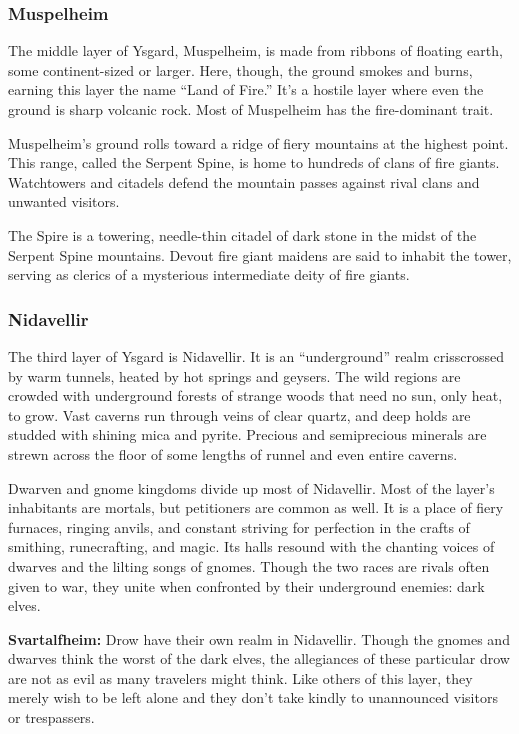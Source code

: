\subsubsection{Muspelheim}
The middle layer of Ysgard, Muspelheim, is made from ribbons of floating earth, some continent-sized or larger. Here, though, the ground smokes and burns, earning this layer the name ``Land of Fire.'' It's a hostile layer where even the ground is sharp volcanic rock. Most of Muspelheim has the fire-dominant trait.

Muspelheim's ground rolls toward a ridge of fiery mountains at the highest point. This range, called the Serpent Spine, is home to hundreds of clans of fire giants. Watchtowers and citadels defend the mountain passes against rival clans and unwanted visitors.

The Spire is a towering, needle-thin citadel of dark stone in the midst of the Serpent Spine mountains. Devout fire giant maidens are said to inhabit the tower, serving as clerics of a mysterious intermediate deity of fire giants.

\subsubsection{Nidavellir}
The third layer of Ysgard is Nidavellir. It is an ``underground'' realm crisscrossed by warm tunnels, heated by hot springs and geysers. The wild regions are crowded with underground forests of strange woods that need no sun, only heat, to grow. Vast caverns run through veins of clear quartz, and deep holds are studded with shining mica and pyrite. Precious and semiprecious minerals are strewn across the floor of some lengths of runnel and even entire caverns.

Dwarven and gnome kingdoms divide up most of Nidavellir. Most of the layer's inhabitants are mortals, but petitioners are common as well. It is a place of fiery furnaces, ringing anvils, and constant striving for perfection in the crafts of smithing, runecrafting, and magic. Its halls resound with the chanting voices of dwarves and the lilting songs of gnomes. Though the two races are rivals often given to war, they unite when confronted by their underground enemies: dark elves.

\textbf{Svartalfheim:} Drow have their own realm in Nidavellir. Though the gnomes and dwarves think the worst of the dark elves, the allegiances of these particular drow are not as evil as many travelers might think. Like others of this layer, they merely wish to be left alone and they don't take kindly to unannounced visitors or trespassers.
